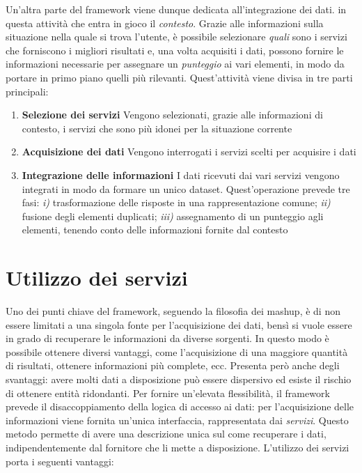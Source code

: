 Un'altra parte del framework viene dunque dedicata all'integrazione dei dati. \upe in questa attività che entra in gioco il \emph{contesto}. Grazie alle informazioni sulla situazione nella quale si trova l'utente, è possibile selezionare \emph{quali} sono i servizi che forniscono i migliori risultati e, una volta acquisiti i dati, possono fornire le informazioni necessarie per assegnare un \emph{punteggio} ai vari elementi, in modo da portare in primo piano quelli più rilevanti. Quest'attività viene divisa in tre parti principali:

\begin{enumerate}
	\item \textbf{Selezione dei servizi}
	Vengono selezionati, grazie alle informazioni di contesto, i servizi che sono più idonei per la situazione corrente
	\item \textbf{Acquisizione dei dati}
	Vengono interrogati i servizi scelti per acquisire i dati
	\item \textbf{Integrazione delle informazioni}
	I dati ricevuti dai vari servizi vengono integrati in modo da formare un unico dataset. Quest'operazione prevede tre fasi: \emph{i)} trasformazione delle risposte in una rappresentazione comune; \emph{ii)} fusione degli elementi duplicati; \emph{iii)} assegnamento di un punteggio agli elementi, tenendo conto delle informazioni fornite dal contesto
\end{enumerate}

\section{Utilizzo dei servizi\label{sec:utilizzo-servizi}}

Uno dei punti chiave del framework, seguendo la filosofia dei mashup, è di non essere limitati a una singola fonte per l'acquisizione dei dati, bensì si vuole essere in grado di recuperare le informazioni da diverse sorgenti. In questo modo è possibile ottenere diversi vantaggi, come l'acquisizione di una maggiore quantità di risultati, ottenere informazioni più complete, ecc. Presenta però anche degli svantaggi: avere molti dati a disposizione può essere dispersivo ed esiste il rischio di ottenere entità ridondanti. Per fornire un'elevata flessibilità, il framework prevede il disaccoppiamento della logica di accesso ai dati: per l'acquisizione delle informazioni viene fornita un'unica interfaccia, rappresentata dai \emph{servizi}. Questo metodo permette di avere una descrizione unica sul come recuperare i dati, indipendentemente dal fornitore che li mette a disposizione. L'utilizzo dei servizi porta i seguenti vantaggi:

